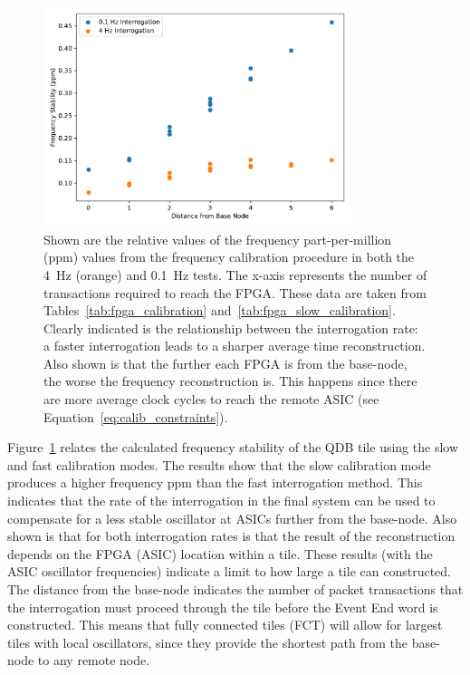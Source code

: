 \begin{figure}[]
\centering
\includegraphics[width=0.8\textwidth]{images/interrogation_ppm_diff.pdf}
\caption{Shown are the relative values of the frequency part-per-million (ppm) values from the frequency calibration procedure in both the 4~\unit{Hz} (orange) and 0.1~\unit{Hz} tests.
The x-axis represents the number of transactions required to reach the FPGA.
These data are taken from Tables~\ref{tab:fpga_calibration} and~\ref{tab:fpga_slow_calibration}.
Clearly indicated is the relationship between the interrogation rate: a faster interrogation leads to a sharper average time reconstruction.
Also shown is that the further each FPGA is from the base-node, the worse the frequency reconstruction is.
This happens since there are more average clock cycles to reach the remote ASIC (see Equation~\ref{eq:calib_constraints}).
}
\label{fig:calibration_position}
\end{figure}

Figure~\ref{fig:calibration_position} relates the calculated frequency stability of the QDB tile using the slow and fast calibration modes.
The results show that the slow calibration mode produces a higher frequency ppm than the fast interrogation method. 
This indicates that the rate of the interrogation in the final system can be used to compensate for a less stable oscillator at ASICs further from the base-node.
Also shown is that for both interrogation rates is that the result of the reconstruction depends on the FPGA (ASIC) location within a tile.
These results (with the ASIC oscillator frequencies) indicate a limit to how large a tile can constructed.
The distance from the base-node indicates the number of packet transactions that the interrogation must proceed through the tile before the Event End word is constructed.
This means that fully connected tiles (FCT) will allow for largest tiles with local oscillators, since they provide the shortest path from the base-node to any remote node.

